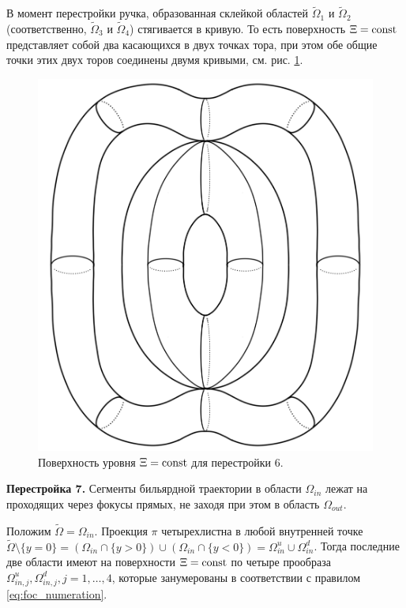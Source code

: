 В момент перестройки ручка, образованная склейкой областей $\widetilde{\Omega}_1$ и $\widetilde{\Omega}_2$ (соответственно, $\widetilde{\Omega}_3$ и $\widetilde{\Omega}_4$) стягивается в кривую. 
То есть поверхность $\Xi = \mathrm{const}$ представляет собой два касающихся в двух точках тора, при этом обе общие точки этих двух торов соединены двумя кривыми, см. рис. \ref{fig:pt9:_atom_6}.
\begin{figure}[!htb]
\centering
\includegraphics[scale=0.09]{images/section2/atoms/atom_6.pdf}
    \caption{Поверхность уровня $\Xi = \mathrm{const}$ для перестройки 6.}
    \label{fig:pt9:_atom_6}
\end{figure}


\textbf{Перестройка 7.}
Сегменты бильярдной траектории в области $\Omega_{in}$ лежат на проходящих через фокусы прямых, не заходя при этом в область $\Omega_{out}$.

Положим $\widetilde{\Omega} = \Omega_{in}$. Проекция $\pi$ четырехлистна в любой внутренней точке $\widetilde{\Omega} \setminus \{y=0\}  = (\Omega_{in} \cap \{y>0\}) \cup (\Omega_{in} \cap \{y<0\}) = \Omega_{in}^u \cup \Omega_{in}^d$.
Тогда последние две области имеют на поверхности $\Xi = \mathrm{const}$ по четыре прообраза $\Omega_{in, j}^u, \Omega_{in, j}^d, j=1, \ldots, 4$, которые занумерованы в соответствии с правилом \eqref{eq:foc_numeration}.

